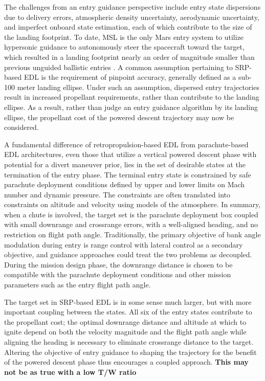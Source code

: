 \documentclass[letterpaper, preprint, paper,11pt]{AAS}
\begin{document}
The challenges from an entry guidance perspective include entry state dispersions due to delivery errors, atmospheric density uncertainty, aerodynamic uncertainty, and imperfect onboard state estimation, each of which contribute to the size of the landing footprint. To date, MSL is the only Mars entry system to utilize hypersonic guidance to autonomously steer the spacecraft toward the target, which resulted in a landing footprint nearly an order of magnitude smaller than previous unguided ballistic entries \cite{BraunMarsEDL}. A common assumption pertaining to SRP-based EDL is the requirement of pinpoint accuracy, generally defined as a sub-100 meter landing ellipse. Under such an assumption, dispersed entry trajectories result in increased propellant requirements, rather than contribute to the landing ellipse. As a result, rather than judge an entry guidance algorithm by its landing ellipse, the propellant cost of the powered descent trajectory may now be considered.

A fundamental difference of retropropulsion-based EDL from parachute-based EDL architectures, even those that utilize a vertical powered descent phase with potential for a divert maneuver prior, lies in the set of desirable states at the termination of the entry phase. The terminal entry state is constrained by safe parachute deployment conditions defined by upper and lower limits on Mach number and dynamic pressure. The constraints are often translated into constraints on altitude and velocity using models of the atmosphere. In summary, when a chute is involved, the target set is the parachute deployment box coupled with small downrange and crossrange errors, with a well-aligned heading, and no restriction on flight path angle. Traditionally, the primary objective of bank angle modulation during entry is range control with lateral control as a secondary objective, and guidance approaches could treat the two problems as decoupled. During the mission design phase, the downrange distance is chosen to be compatible with the parachute deployment conditions and other mission parameters such as the entry flight path angle.

The target set in SRP-based EDL is in some sense much larger, but with more important coupling between the states. All six of the entry states contribute to the propellant cost; the optimal downrange distance and altitude at which to ignite depend on both the velocity magnitude and the flight path angle while aligning the heading is necessary to eliminate crossrange distance to the target. Altering the objective of entry guidance to shaping the trajectory for the benefit of the powered descent phase thus encourages a coupled approach. \textbf{This may not be as true with a low T/W ratio} 
\end{document}

